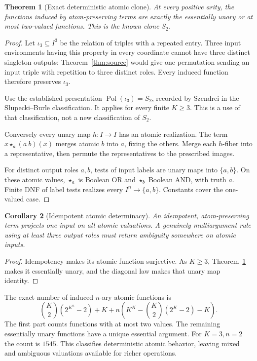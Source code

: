 \documentclass[11pt]{article}
\newtheorem{theorem}{Theorem}[section]
\newtheorem{corollary}[theorem]{Corollary}
\begin{document}
\begin{theorem}[Exact deterministic atomic clone]\label{thm:S2}
At every positive arity, the functions induced by atom-preserving terms
are exactly the essentially unary or at most two-valued functions.
This is the known clone $S_2$.
\end{theorem}
\begin{proof}
Let $\iota_3\subseteq I^3$ be the relation of triples with a repeated
entry. Three input environments having this property in every
coordinate cannot have three distinct singleton outputs:
Theorem~\ref{thm:source} would give one permutation sending an input
triple with repetition to three distinct roles. Every induced function
therefore preserves $\iota_3$.

Use the established presentation $\operatorname{Pol}(\iota_3)=S_2$,
recorded by Szendrei\cite[Proposition~2.2]{Szendrei2012} in the
S\l upecki--Burle classification. It applies for every finite $K\geq3$.
This is a use of that classification, not a new classification of $S_2$.

Conversely every unary map $h:I\to I$ has an atomic realization.
The term $x\star_a(a\ b)(x)$ merges atomic $b$ into $a$, fixing the
others. Merge each $h$-fiber into a representative, then permute the
representatives to the prescribed images.

For distinct output roles $a,b$, tests of input labels are unary maps
into $\{a,b\}$. On these atomic values, $\star_a$ is Boolean OR and
$\star_b$ Boolean AND, with truth $a$. Finite DNF of label tests
realizes every $I^n\to\{a,b\}$. Constants cover the one-valued case.
\end{proof}

\begin{corollary}[Idempotent atomic determinacy]
An idempotent, atom-preserving term projects one input on all atomic
valuations. A genuinely multiargument rule using at least three output
roles must return ambiguity somewhere on atomic inputs.
\end{corollary}
\begin{proof}
Idempotency makes its atomic function surjective. As $K\geq3$,
Theorem~\ref{thm:S2} makes it essentially unary, and the diagonal law
makes that unary map identity.
\end{proof}

The exact number of induced $n$-ary atomic functions is
\[
 \binom K2(2^{K^n}-2)+K+
 n\left(K^K-\binom K2(2^K-2)-K\right).
\]
The first part counts functions with at most two values. The remaining
essentially unary functions have a unique essential argument.
For $K=3,n=2$ the count is $1545$. This classifies deterministic atomic
behavior, leaving mixed and ambiguous valuations available for richer
operations.
\end{document}

